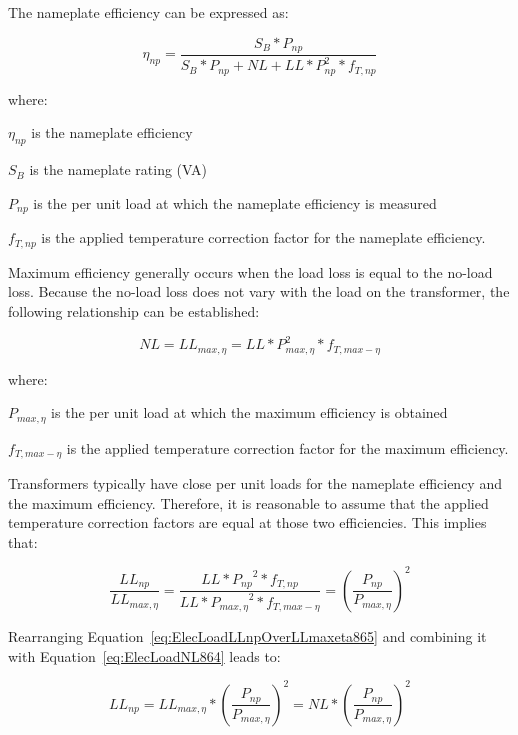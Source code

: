 The nameplate efficiency can be expressed as:

\begin{equation}
{\eta_{np}} = \frac{{{S_B}*{P_{np}}}}{{{S_B}*{P_{np}} + NL + LL*P_{np}^2*{f_{T,np}}}}
\label{eq:ElecLoadetanp863}
\end{equation}

where:

\({\eta_{np}}\) is the nameplate efficiency

\({S_B}\) is the nameplate rating (VA)

\({P_{np}}\) is the per unit load at which the nameplate efficiency is measured

\({f_{T,np}}\) is the applied temperature correction factor for the nameplate efficiency.

Maximum efficiency generally occurs when the load loss is equal to the no-load loss. Because the no-load loss does not vary with the load on the transformer, the following relationship can be established:

\begin{equation}
NL = L{L_{max,\eta}} = LL*P_{max,\eta }^2*{f_{T,max-\eta}}
\label{eq:ElecLoadNL864}
\end{equation}

where:

\({P_{max,\eta}}\) is the per unit load at which the maximum efficiency is obtained

\({f_{T,max-\eta}}\) is the applied temperature correction factor for the maximum efficiency.

Transformers typically have close per unit loads for the nameplate efficiency and the maximum efficiency. Therefore, it is reasonable to assume that the applied temperature correction factors are equal at those two efficiencies. This implies that:

\begin{equation}
\frac{{L{L_{np}}}}{{L{L_{max,\eta}}}} = \frac{{LL*{P_{np}}^2*{f_{T,np}}}}{{LL*{P_{max,\eta}}^2*{f_{T,max-\eta}}}} = {\left( {\frac{{{P_{np}}}}{{{P_{max,\eta}}}}} \right)^2}
\label{eq:ElecLoadLLnpOverLLmaxeta865}
\end{equation}

Rearranging Equation~\ref{eq:ElecLoadLLnpOverLLmaxeta865} and combining it with Equation~\ref{eq:ElecLoadNL864} leads to:

\begin{equation}
L{L_{np}} = L{L_{max,\eta}}*{\left( {\frac{{{P_{np}}}}{{{P_{max,\eta}}}}} \right)^2} = NL*{\left( {\frac{{{P_{np}}}}{{{P_{max,\eta}}}}} \right)^2}
\label{eq:ElecLoadLLnp866}
\end{equation}

